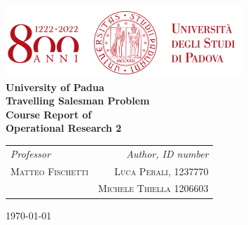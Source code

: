 
\begin{titlepage}
  \clearpage\thispagestyle{empty}
  \centering
  \vspace{2cm}

  \includegraphics[scale=0.75]{uniLogo.png} \\ [1cm]
  \LARGE\textbf{University of Padua} \\ [4cm]
  \Huge\textbf{Travelling Salesman Problem} \\ [1cm]
  \Large\textbf{Course Report of \\ Operational Research 2} \\ [4cm]
  \begin{table}[h]
    \begin{tabularx}{\textwidth}{X r}

        \Large\textit{Professor}  & \Large\textit{Author, ID number} \\ [0.2cm]
        \Large\textsc{Matteo Fischetti}  & \Large\textsc{Luca Perali, 1237770} \\ [0.2cm]
          & \Large\textsc{Michele Thiella 1206603} \\ [0.3cm]
        \hline
    \end{tabularx}
  \end{table}

  \textsc\Large \today \\ [2cm]

  \pagebreak
\end{titlepage}

